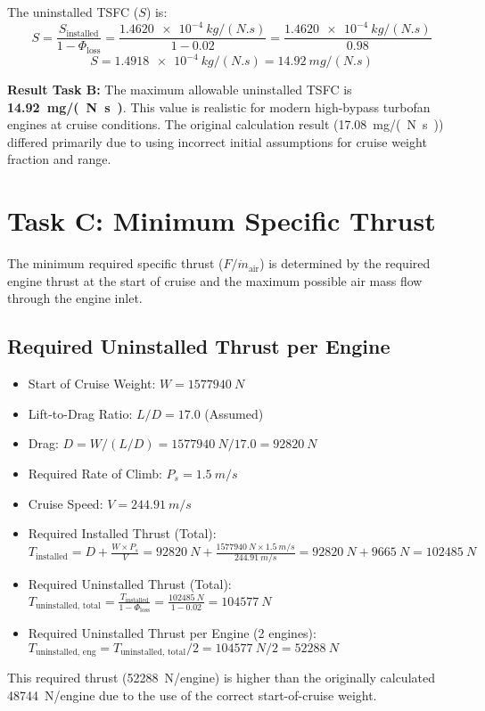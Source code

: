 \documentclass{article}
\begin{document}
The uninstalled TSFC ($S$) is:
\[ S = \frac{S_{\text{installed}}}{1 - \Phi_{\text{loss}}} = \frac{\SI{1.4620e-4}{kg/(N.s)}}{1 - 0.02} = \frac{\SI{1.4620e-4}{kg/(N.s)}}{0.98} \]
\[ S = \SI{1.4918e-4}{kg/(N.s)} = \SI{14.92}{mg/(N.s)} \]

\textbf{Result Task B:} The maximum allowable uninstalled TSFC is \textbf{\SI{14.92}{mg/(N.s)}}. This value is realistic for modern high-bypass turbofan engines at cruise conditions. The original calculation result (\SI{17.08}{mg/(N.s)}) differed primarily due to using incorrect initial assumptions for cruise weight fraction and range.

\section{Task C: Minimum Specific Thrust}

The minimum required specific thrust ($F/ \dot{m}_{\text{air}}$) is determined by the required engine thrust at the start of cruise and the maximum possible air mass flow through the engine inlet.

\subsection{Required Uninstalled Thrust per Engine}
\begin{itemize}
    \item Start of Cruise Weight: $W = \SI{1577940}{N}$ \cite{manual}
    \item Lift-to-Drag Ratio: $L/D = 17.0$ (Assumed)
    \item Drag: $D = W / (L/D) = \SI{1577940}{N} / 17.0 = \SI{92820}{N}$
    \item Required Rate of Climb: $P_s = \SI{1.5}{m/s}$ \cite{manual}
    \item Cruise Speed: $V = \SI{244.91}{m/s}$
    \item Required Installed Thrust (Total): $T_{\text{installed}} = D + \frac{W \times P_s}{V} = \SI{92820}{N} + \frac{\SI{1577940}{N} \times \SI{1.5}{m/s}}{\SI{244.91}{m/s}} = \SI{92820}{N} + \SI{9665}{N} = \SI{102485}{N}$
    \item Required Uninstalled Thrust (Total): $T_{\text{uninstalled, total}} = \frac{T_{\text{installed}}}{1 - \Phi_{\text{loss}}} = \frac{\SI{102485}{N}}{1 - 0.02} = \SI{104577}{N}$
    \item Required Uninstalled Thrust per Engine (2 engines): $T_{\text{uninstalled, eng}} = T_{\text{uninstalled, total}} / 2 = \SI{104577}{N} / 2 = \SI{52288}{N}$
\end{itemize}
This required thrust (\SI{52288}{N}/engine) is higher than the originally calculated \SI{48744}{N}/engine due to the use of the correct start-of-cruise weight.
\end{document}
